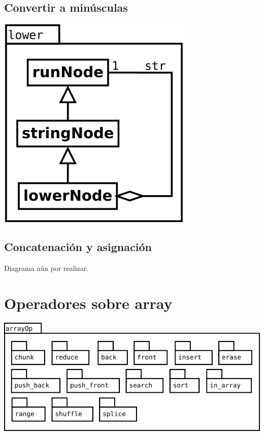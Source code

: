\subsection {Convertir a minúsculas}
\begin{center}
\includegraphics[scale=0.4]{lower.png} \\
\end{center}

\subsection {Concatenación y asignación}
Diagrama aún por realizar.
\pagebreak
\section {Operadores sobre array}
\begin{center}
\includegraphics[scale=0.4]{arrayOp-package.png} \\
\end{center}

